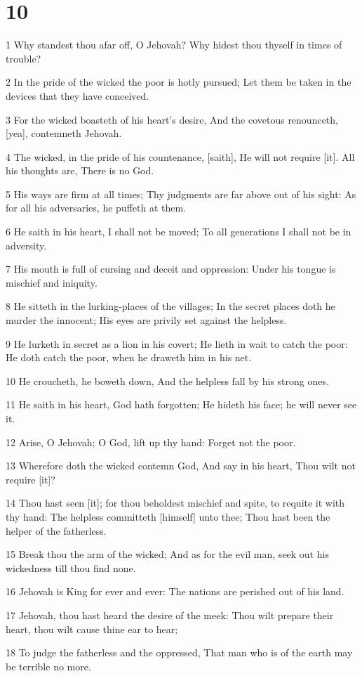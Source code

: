 \chapter{10}

\par 1 Why standest thou afar off, O Jehovah? Why hidest thou thyself in times of trouble?
\par 2 In the pride of the wicked the poor is hotly pursued; Let them be taken in the devices that they have conceived.
\par 3 For the wicked boasteth of his heart's desire, And the covetous renounceth, [yea], contemneth Jehovah.
\par 4 The wicked, in the pride of his countenance, [saith], He will not require [it]. All his thoughts are, There is no God.
\par 5 His ways are firm at all times; Thy judgments are far above out of his sight: As for all his adversaries, he puffeth at them.
\par 6 He saith in his heart, I shall not be moved; To all generations I shall not be in adversity.
\par 7 His mouth is full of cursing and deceit and oppression: Under his tongue is mischief and iniquity.
\par 8 He sitteth in the lurking-places of the villages; In the secret places doth he murder the innocent; His eyes are privily set against the helpless.
\par 9 He lurketh in secret as a lion in his covert; He lieth in wait to catch the poor: He doth catch the poor, when he draweth him in his net.
\par 10 He croucheth, he boweth down, And the helpless fall by his strong ones.
\par 11 He saith in his heart, God hath forgotten; He hideth his face; he will never see it.
\par 12 Arise, O Jehovah; O God, lift up thy hand: Forget not the poor.
\par 13 Wherefore doth the wicked contemn God, And say in his heart, Thou wilt not require [it]?
\par 14 Thou hast seen [it]; for thou beholdest mischief and spite, to requite it with thy hand: The helpless committeth [himself] unto thee; Thou hast been the helper of the fatherless.
\par 15 Break thou the arm of the wicked; And as for the evil man, seek out his wickedness till thou find none.
\par 16 Jehovah is King for ever and ever: The nations are perished out of his land.
\par 17 Jehovah, thou hast heard the desire of the meek: Thou wilt prepare their heart, thou wilt cause thine ear to hear;
\par 18 To judge the fatherless and the oppressed, That man who is of the earth may be terrible no more.

